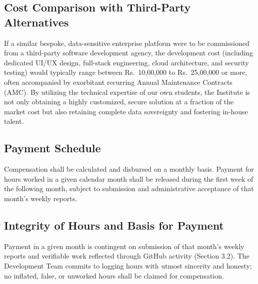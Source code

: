 \documentclass[11pt]{article}
\begin{document}
\subsection{Cost Comparison with Third-Party Alternatives}
If a similar bespoke, data-sensitive enterprise platform were to be commissioned from a third-party software development agency, the development cost (including dedicated UI/UX design, full-stack engineering, cloud architecture, and security testing) would typically range between Rs.~10,00,000 to Rs.~25,00,000 or more, often accompanied by exorbitant recurring Annual Maintenance Contracts (AMC). By utilizing the technical expertise of our own students, the Institute is not only obtaining a highly customized, secure solution at a fraction of the market cost but also retaining complete data sovereignty and fostering in-house talent.


\subsection{Payment Schedule}
Compensation shall be calculated and disbursed on a monthly basis. Payment for hours worked in a given calendar month shall be released during the first week of the following month, subject to submission and administrative acceptance of that month's weekly reports.

\subsection{Integrity of Hours and Basis for Payment}
Payment in a given month is contingent on submission of that month's weekly reports and verifiable work reflected through GitHub activity (Section 3.2). The Development Team commits to logging hours with utmost sincerity and honesty; no inflated, false, or unworked hours shall be claimed for compensation.

\end{document}
